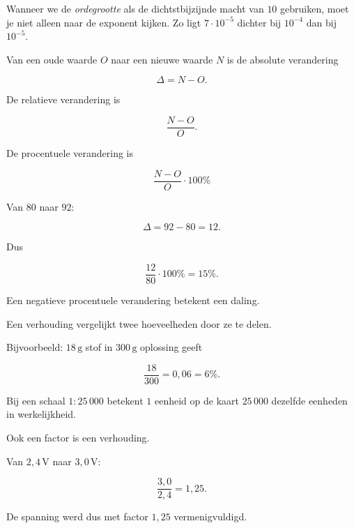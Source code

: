 \documentclass{ximera}
\begin{document}
\begin{opmerking}
Wanneer we de \emph{ordegrootte} als de dichtstbijzijnde macht van \(10\) gebruiken,
moet je niet alleen naar de exponent kijken. Zo ligt
\(7\cdot10^{-5}\) dichter bij \(10^{-4}\) dan bij \(10^{-5}\).
\end{opmerking}




Van een oude waarde \(O\) naar een nieuwe waarde \(N\) is de absolute verandering

\[
\Delta=N-O.
\]

De relatieve verandering is

\[
\frac{N-O}{O}.
\]

De procentuele verandering is

\[
\boxed{
\frac{N-O}{O}\cdot100\%
}
\]

\begin{voorbeeld}
Van \(80\) naar \(92\):

\[
\Delta=92-80=12.
\]

Dus

\[
\frac{12}{80}\cdot100\%
=
15\%.
\]
\end{voorbeeld}

Een negatieve procentuele verandering betekent een daling.






Een verhouding vergelijkt twee hoeveelheden door ze te delen.

Bijvoorbeeld: \(18\,\mathrm g\) stof in \(300\,\mathrm g\) oplossing geeft

\[
\frac{18}{300}=0{,}06=6\%.
\]

Bij een schaal \(1:25\,000\) betekent \(1\) eenheid op de kaart \(25\,000\)
dezelfde eenheden in werkelijkheid.

Ook een factor is een verhouding.

Van \(2{,}4\,\mathrm V\) naar \(3{,}0\,\mathrm V\):

\[
\frac{3{,}0}{2{,}4}=1{,}25.
\]

De spanning werd dus met factor \(1{,}25\) vermenigvuldigd.


\end{document}

